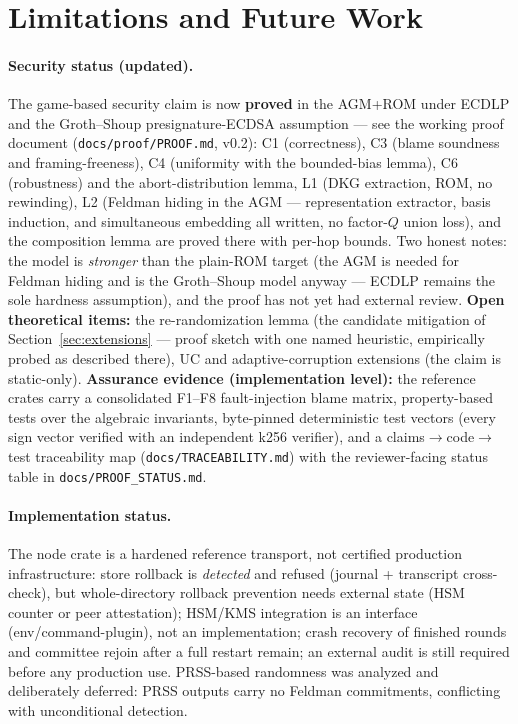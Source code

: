 \documentclass[11pt]{article}
\theoremstyle{plain}
\theoremstyle{definition}
\theoremstyle{remark}
\begin{document}
\section{Limitations and Future Work}

\paragraph{Security status (updated).} The game-based security claim is now \textbf{proved} in the AGM+ROM under ECDLP and the Groth--Shoup presignature-ECDSA assumption --- see the working proof document (\texttt{docs/proof/PROOF.md}, v0.2): C1 (correctness), C3 (blame soundness and framing-freeness), C4 (uniformity with the bounded-bias lemma), C6 (robustness) and the abort-distribution lemma, L1 (DKG extraction, ROM, no rewinding), L2 (Feldman hiding in the AGM --- representation extractor, basis induction, and simultaneous embedding all written, no factor-$Q$ union loss), and the composition lemma are proved there with per-hop bounds. Two honest notes: the model is \emph{stronger} than the plain-ROM target (the AGM is needed for Feldman hiding and is the Groth--Shoup model anyway --- ECDLP remains the sole hardness assumption), and the proof has not yet had external review. \textbf{Open theoretical items:} the re-randomization lemma (the candidate mitigation of Section~\ref{sec:extensions} --- proof sketch with one named heuristic, empirically probed as described there), UC and adaptive-corruption extensions (the claim is static-only). \textbf{Assurance evidence (implementation level):} the reference crates carry a consolidated F1--F8 fault-injection blame matrix, property-based tests over the algebraic invariants, byte-pinned deterministic test vectors (every sign vector verified with an independent k256 verifier), and a claims$\to$code$\to$test traceability map (\texttt{docs/TRACEABILITY.md}) with the reviewer-facing status table in \texttt{docs/PROOF\_STATUS.md}.

\paragraph{Implementation status.} The node crate is a hardened reference transport, not certified production infrastructure: store rollback is \emph{detected} and refused (journal + transcript cross-check), but whole-directory rollback prevention needs external state (HSM counter or peer attestation); HSM/KMS integration is an interface (env/command-plugin), not an implementation; crash recovery of finished rounds and committee rejoin after a full restart remain; an external audit is still required before any production use. PRSS-based randomness was analyzed and deliberately deferred: PRSS outputs carry no Feldman commitments, conflicting with unconditional detection.
\end{document}
